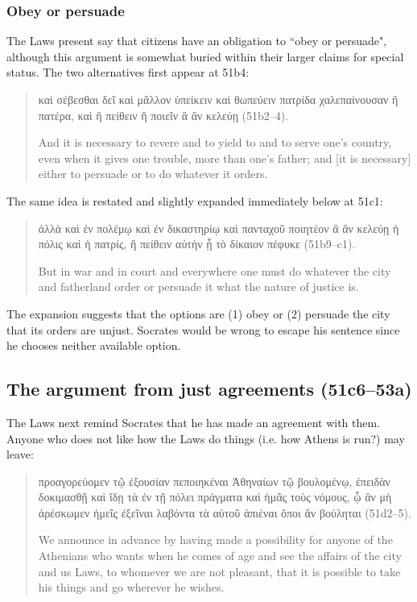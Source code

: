 \documentclass[11pt]{article}
\begin{document}
\subsubsection{Obey or persuade}

The Laws present say that citizens have an obligation to ``obey or persuade", although this argument is somewhat buried within their larger claims for special status.  The two alternatives first appear at 51b4:

\begin{quote}
    καὶ σέβεσθαι δεῖ καὶ μᾶλλον ὑπείκειν καὶ θωπεύειν πατρίδα χαλεπαίνουσαν ἢ πατέρα, καὶ ἢ πείθειν ἢ ποιεῖν ἃ ἂν κελεύῃ (51b2--4).

    And it is necessary to revere and to yield to and to serve one's country, even when it gives one trouble, more than one's father; and [it is necessary] either to persuade or to do whatever it orders.
\end{quote}

The same idea is restated and slightly expanded immediately below at 51c1:

\begin{quote}
    ἀλλὰ καὶ ἐν πολέμῳ καὶ ἐν δικαστηρίῳ καὶ πανταχοῦ ποιητέον ἃ ἂν κελεύῃ ἡ πόλις καὶ ἡ πατρίς, ἢ πείθειν αὐτὴν ᾗ τὸ δίκαιον πέφυκε (51b9--c1).

    But in war and in court and everywhere one must do whatever the city and fatherland order or persuade it what the nature of justice is.
\end{quote}

The expansion suggests that the options are (1) obey or (2) persuade the city that its orders are unjust. Socrates would be wrong to escape his sentence since he chooses neither available option.

\subsection{The argument from just agreements (51c6--53a)}

The Laws next remind Socrates that he has made an agreement with them.  Anyone who does not like how the Laws do things (i.e. how Athens is run?) may leave:

\begin{quote}
    προαγορεύομεν τῷ ἐξουσίαν πεποιηκέναι Ἀθηναίων τῷ βουλομένῳ, ἐπειδὰν δοκιμασθῇ καὶ ἴδῃ τὰ ἐν τῇ πόλει πράγματα καὶ ἡμᾶς τοὺς νόμους, ᾧ ἂν μὴ ἀρέσκωμεν ἡμεῖς ἐξεῖναι λαβόντα τὰ αὑτοῦ ἀπιέναι ὅποι ἂν βούληται (51d2--5).

    We announce in advance by having made a possibility for anyone of the Athenians who wants when he comes of age and see the affairs of the city and us Laws, to whomever we are not pleasant, that it is possible to take his things and go wherever he wishes.
\end{quote}
\end{document}
